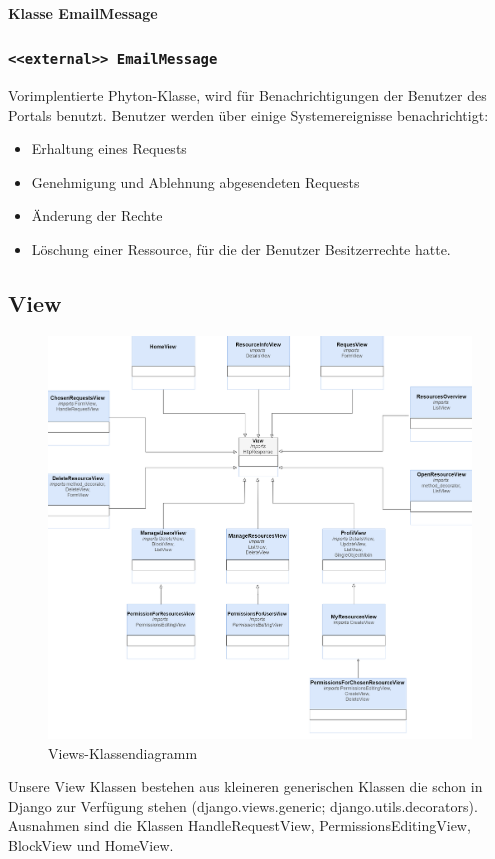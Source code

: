 \documentclass[parskip=full,11pt]{scrartcl}
\newcommand{\class}[1]{\subsubsection*{\lstinline[basicstyle=\ttfamily\large]{#1}}}
\begin{document}
 
 
  \paragraph*{Klasse EmailMessage}
 \class{<<external>> EmailMessage}
 Vorimplentierte Phyton-Klasse, wird für Benachrichtigungen der Benutzer des Portals benutzt. Benutzer werden über einige Systemereignisse benachrichtigt:
 \begin{itemize}
	\item Erhaltung eines Requests
	\item Genehmigung und Ablehnung abgesendeten Requests
	\item Änderung der Rechte
	\item Löschung einer Ressource, für die der Benutzer Besitzerrechte hatte.
\end{itemize}
\newpage 
\subsection{View}
\begin{figure}[ht!]
	\centering
	\includegraphics[width=\textwidth]{res/views}
	\caption{Views-Klassendiagramm}
\end{figure}

Unsere View Klassen bestehen aus kleineren generischen Klassen die schon in Django zur Verfügung stehen (django.views.generic; django.utils.decorators). Ausnahmen sind die Klassen HandleRequestView, PermissionsEditingView, BlockView und HomeView.
\end{document}
